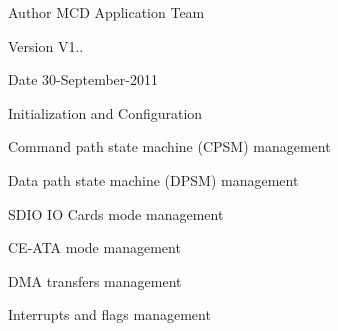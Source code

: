 \begin{DoxyAuthor}{Author}
M\+CD Application Team 
\end{DoxyAuthor}
\begin{DoxyVersion}{Version}
V1.. 
\end{DoxyVersion}
\begin{DoxyDate}{Date}
30-\/\+September-\/2011
\begin{DoxyItemize}
\item Initialization and Configuration
\item Command path state machine (C\+P\+SM) management
\item Data path state machine (D\+P\+SM) management
\item S\+D\+IO IO Cards mode management
\item C\+E-\/\+A\+TA mode management
\item D\+MA transfers management
\item Interrupts and flags management
\end{DoxyItemize}
\end{DoxyDate}
